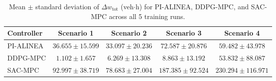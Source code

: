 \begin{table}[htbp]
\centering
\caption{Mean $\pm$ standard deviation of $\Delta w_{\mathrm{tot}}$ (veh$\cdot$h) for PI-ALINEA, DDPG-MPC, and SAC-MPC across all 5 training runs.}
\label{tab:dw_tot_multi}
\begin{tabular}{lcccc}
\toprule
Controller & Scenario 1 & Scenario 2 & Scenario 3 & Scenario 4 \\
\midrule
PI-ALINEA & $36.655 \pm 15.599$ & $33.097 \pm 20.236$ & $72.587 \pm 20.876$ & $59.482 \pm 43.978$ \\
DDPG-MPC & $1.102 \pm 1.657$ & $6.269 \pm 13.308$ & $8.863 \pm 13.192$ & $53.832 \pm 88.087$ \\
SAC-MPC & $92.997 \pm 38.719$ & $78.683 \pm 27.004$ & $187.385 \pm 92.524$ & $230.294 \pm 116.971$ \\
\bottomrule
\end{tabular}
\end{table}
